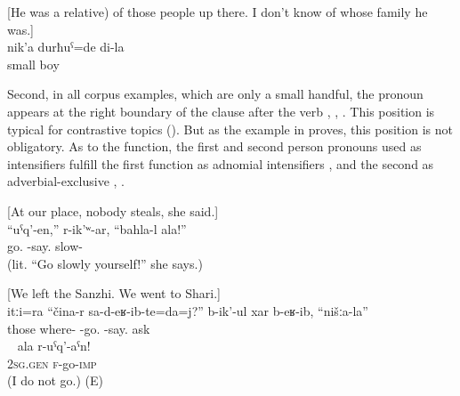 \begin{exe}
	\ex	\label{ex:ex:I was a little boy@BREFLIST}
	\begin{xlist}
	\ex	\label{ex:I was a little boy@BREFL} [He was a relative) of those people up there. I don't know of whose family he was.] \\
	\gll	nik'a	durħuˁ=de	di-la\\
		small	boy	\\
	\glt	{}
	
		\end{xlist}
\end{exe}

Second, in all corpus examples, which are only a small handful, the  pronoun appears at the right boundary of the clause after the verb , , . This position is typical for contrastive topics (). But as the example in  proves, this position is not obligatory. As to the function, the first and second person  pronouns used as intensifiers fulfill the first function as adnomial intensifiers ,  and the second as adverbial-exclusive  , .

\begin{exe}
		\ex	\label{You can leave on your own, she says, without worries.} [‎‎At our place, nobody steals, she said.]\\
		\gll	``uˁq'-en,''	r-ik'ʷ-ar,	``bahla-l	ala!''\\
			go.	-say.	slow-	 \\
		\glt	{} (lit. ``Go slowly yourself!'' she says.)
		
			\ex	\label{They asked us, where did you come from?} [We left the Sanzhi. We went to Shari.]\\
		\gll	itːi=ra	``čina-r	sa-d-eʁ-ib-te=da=j?''	b-ik'-ul	xar	b-eʁ-ib,	``nišːa-la''\\
			those	where-	-go.	-say.	ask		\\
		\glt	{} 
\
			\ex	\label{ex:(You) yourself go awayREFL}
		\gll	ala	r-uˁq'-aˁn!\\
			2\textsc{sg}.\textsc{gen}	\textsc{f}-go-\textsc{imp}\\
		\glt	{} (I do not go.) (E)
\end{exe}


